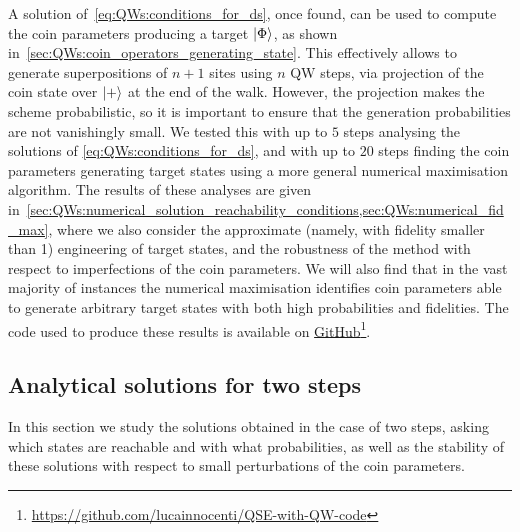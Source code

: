 A solution of~\cref{eq:QWs:conditions_for_ds}, once found, can be used to compute the coin parameters producing a target $\ket\Phi$, as shown in~\cref{sec:QWs:coin_operators_generating_state}.
This effectively allows to generate superpositions of $n+1$ sites using $n$ \ac{QW} steps, via projection of the coin state over $\ket+$ at the end of the walk.
However, the projection makes the scheme probabilistic, so it is important to ensure that the generation probabilities are not vanishingly small.
We tested this with up to $5$ steps analysing the solutions of \cref{eq:QWs:conditions_for_ds}, and with up to $20$ steps finding the coin parameters generating target states using a more general numerical maximisation algorithm.
The results of these analyses are given in~\cref{sec:QWs:numerical_solution_reachability_conditions,sec:QWs:numerical_fid_max},
where we also consider the approximate (namely, with fidelity smaller than 1) engineering of target states,
and the robustness of the method with respect to imperfections of the coin parameters.
We will also find that in the vast majority of instances the numerical maximisation identifies coin parameters able to generate arbitrary target states with both high probabilities and fidelities.
The code used to produce these results is available on \href{https://github.com/lucainnocenti/QSE-with-QW-code}{GitHub}\footnote{\href{https://github.com/lucainnocenti/QSE-with-QW-code}{https://github.com/lucainnocenti/QSE-with-QW-code}}.

\subsection{Analytical solutions for two steps}
\label{sec:QWs:analytical_sol_2steps}

In this section we study the solutions obtained in the case of two steps, asking which states are reachable and with what probabilities, as well as the stability of these solutions with respect to small perturbations of the coin parameters.

